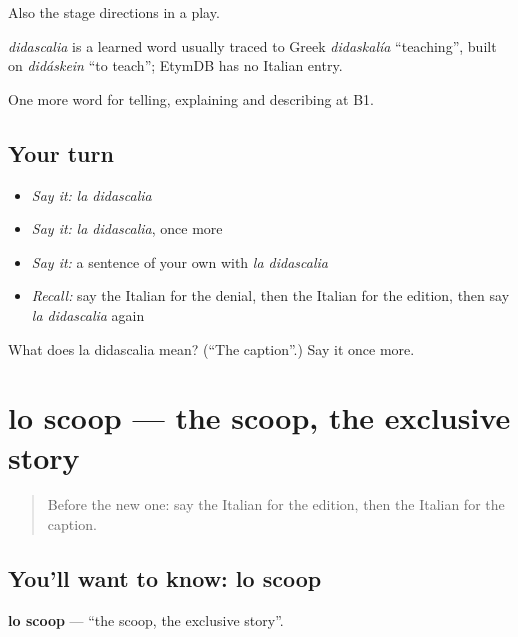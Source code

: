 Also the stage directions in a play.

\begin{cousinweb}
\emph{didascalia} is a learned word usually traced to Greek \emph{didaskalía} \textquotedblleft{}teaching\textquotedblright{}, built on \emph{didáskein} \textquotedblleft{}to teach\textquotedblright{}; EtymDB has no Italian entry.
\end{cousinweb}

\begin{grammarlens}[title={What you've built}]
One more word for telling, explaining and describing at B1.
\end{grammarlens}

\subsection*{Your turn}
\begin{itemize}
\raggedright
  \item \emph{Say it:} \emph{la didascalia}
  \item \emph{Say it:} \emph{la didascalia}, once more
  \item \emph{Say it:} a sentence of your own with \emph{la didascalia}
  \item \emph{Recall:} say the Italian for the denial, then the Italian for the edition, then say \emph{la didascalia} again
\end{itemize}

\begin{tcolorbox}[breakable,colback=teal!4,colframe=teal!35!black,title={Before you move on}]
What does la didascalia mean? (\textquotedblleft{}The caption\textquotedblright{}.) Say it once more.
\end{tcolorbox}
\section[lo scoop]{lo scoop — the scoop, the exclusive story}

\label{lesson:IT-C286-scoop}



\begin{quote}
Before the new one: say the Italian for the edition, then the Italian for the caption.
\end{quote}

\subsection*{You'll want to know: lo scoop}
\textbf{lo scoop} — \textquotedblleft{}the scoop, the exclusive story\textquotedblright{}.

